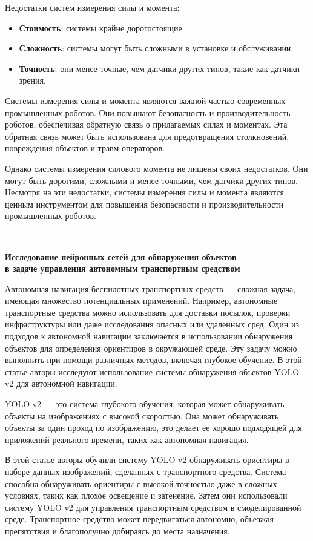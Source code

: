 \documentclass[russian,11pt]{article}
\providecommand{\header}[1]{
\,
\begin{center}
{\Large \textbf{#1}}
\end{center}
}
\begin{document}
Недостатки систем измерения силы и момента:
\begin{itemize}
\item \textbf{Стоимость}: системы крайне дорогостоящие.
\item \textbf{Сложность}: системы могут быть сложными в установке и обслуживании.
\item \textbf{Точность}: они менее точные, чем датчики других типов, такие как датчики зрения.
\end{itemize}

Системы измерения силы и момента являются важной частью современных промышленных роботов. Они повышают безопасность и производительность роботов, обеспечивая обратную связь о прилагаемых силах и моментах. Эта обратная связь может быть использована для предотвращения столкновений, повреждения объектов и травм операторов.

Однако системы измерения силового момента не лишены своих недостатков. Они могут быть дорогими, сложными и менее точными, чем датчики других типов. Несмотря на эти недостатки, системы измерения силы и момента являются ценным инструментом для повышения безопасности и производительности промышленных роботов.

\pagebreak

\header{Исследование нейронных сетей для обнаружения объектов\\в задаче управления автономным транспортным средством \cite{6}}

Автономная навигация беспилотных транспортных средств — сложная задача, имеющая множество потенциальных применений. Например, автономные транспортные средства можно использовать для доставки посылок, проверки инфраструктуры или даже исследования опасных или удаленных сред. Один из подходов к автономной навигации заключается в использовании обнаружения объектов для определения ориентиров в окружающей среде. Эту задачу можно выполнить при помощи различных методов, включая глубокое обучение. В этой статье авторы исследуют использование системы обнаружения объектов YOLO v2 для автономной навигации.

YOLO v2 — это система глубокого обучения, которая может обнаруживать объекты на изображениях с высокой скоростью. Она может обнаруживать объекты за один проход по изображению, это делает ее хорошо подходящей для приложений реального времени, таких как автономная навигация.

В этой статье авторы обучили систему YOLO v2 обнаруживать ориентиры в наборе данных изображений, сделанных с транспортного средства. Система способна обнаруживать ориентиры с высокой точностью даже в сложных условиях, таких как плохое освещение и затенение. Затем они использовали систему YOLO v2 для управления транспортным средством в смоделированной среде. Транспортное средство может передвигаться автономно, объезжая препятствия и благополучно добираясь до места назначения.
\end{document}
